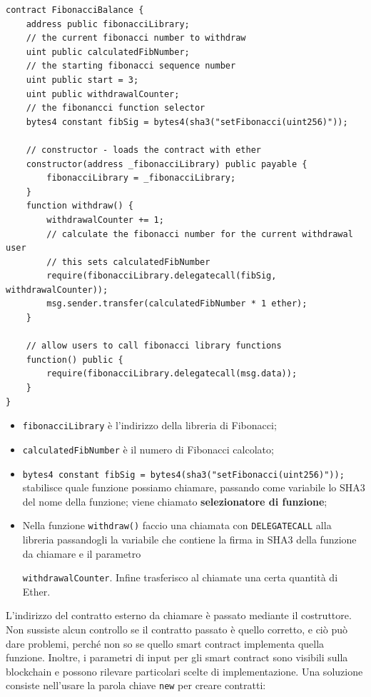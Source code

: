 \begin{lstlisting}[language=Solidity]
contract FibonacciBalance {
    address public fibonacciLibrary;
    // the current fibonacci number to withdraw
    uint public calculatedFibNumber;
    // the starting fibonacci sequence number
    uint public start = 3;    
    uint public withdrawalCounter;
    // the fibonancci function selector
    bytes4 constant fibSig = bytes4(sha3("setFibonacci(uint256)"));
    
    // constructor - loads the contract with ether
    constructor(address _fibonacciLibrary) public payable {
        fibonacciLibrary = _fibonacciLibrary;
    }
    function withdraw() {
        withdrawalCounter += 1;
        // calculate the fibonacci number for the current withdrawal user
        // this sets calculatedFibNumber
        require(fibonacciLibrary.delegatecall(fibSig, withdrawalCounter));
        msg.sender.transfer(calculatedFibNumber * 1 ether);
    }
    
    // allow users to call fibonacci library functions
    function() public {
        require(fibonacciLibrary.delegatecall(msg.data));
    }
}
\end{lstlisting}

\begin{itemize}
    \item \texttt{fibonacciLibrary} è l'indirizzo della libreria di Fibonacci;
    \item \texttt{calculatedFibNumber} è il numero di Fibonacci calcolato;
    \item \texttt{bytes4 constant fibSig = bytes4(sha3("setFibonacci(uint256)"));} stabilisce quale funzione possiamo chiamare, passando come variabile lo SHA3 del nome della funzione; viene chiamato \textbf{selezionatore di funzione};
    \item Nella funzione \texttt{withdraw()} faccio una chiamata con \texttt{DELEGATECALL} alla libreria passandogli la variabile che contiene la firma in SHA3 della funzione da chiamare e il parametro
    
    \texttt{withdrawalCounter}. Infine trasferisco al chiamate una certa quantità di Ether.
\end{itemize}
L'indirizzo del contratto esterno da chiamare è passato mediante il costruttore. Non sussiste alcun controllo se il contratto passato è quello corretto, e ciò può dare problemi, perché non so se quello smart contract implementa quella funzione. Inoltre, i parametri di input per gli smart contract sono visibili sulla blockchain e possono rilevare particolari scelte di implementazione. Una soluzione consiste nell'usare la parola chiave \texttt{new} per creare contratti:

